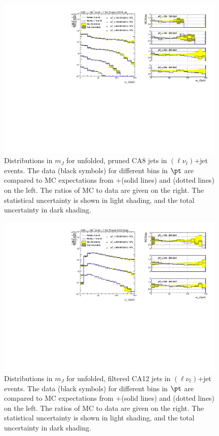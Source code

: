 \begin{figure}[!htb]
\centering
\includegraphics[width=0.99\textwidth]{figs/Wln/jetmassunf_ca8pr_log_W.pdf}
\caption{Distributions in $m_J$ for unfolded, pruned CA8 jets in \PW$(\ell\nu_\ell)$+jet events. The data (black symbols) for different bins in $\pt$ are compared to MC expectations from {\MADGRAPH}+\PYTHIA (solid lines) and \HERWIG (dotted lines) on the left. The ratios of MC to data are given on the right.
The statistical uncertainty is shown in light shading, and the total uncertainty in dark shading.}
\label{figs:prunedWmnInt1}
\end{figure}

\begin{figure}[!htb]
\centering
\includegraphics[width=0.99\textwidth]{figs/Wln/jetmassunf_ca12ft_log_W.pdf}
\caption{Distributions in $m_J$ for unfolded, filtered CA12 jets in \PW$(\ell\nu_\ell)$+jet events. The data (black symbols) for different bins in $\pt$ are compared to MC expectations from {\MADGRAPH}+\PYTHIA (solid lines) and \HERWIG (dotted lines) on the left. The ratios of MC to data are given on the right.
The statistical uncertainty is shown in light shading, and the total uncertainty in dark shading.}
\label{figs:prunedWmnInt2}
\end{figure}

\clearpage






